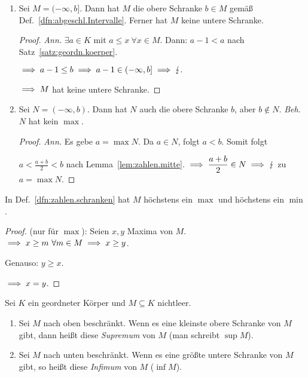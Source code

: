\documentclass[12pt]{scrreprt}
\begin{document}
\begin{bsp}
\begin{enumerate} %
\item Sei $M=(-\infty,b]$. Dann hat $M$ die obere Schranke $b\in M$ gemäß Def.~\ref{dfn:abgeschl.Intervalle}. Ferner hat $M$ keine untere Schranke.
\begin{proof}\emph{Ann.} $\exists a\in K$ mit $a \leq x\ \forall x\in M$. Dann: $a-1<a$ nach Satz~\ref{satz:geordn.koerper}.

$\implies a-1\leq b \implies a-1\in (-\infty,b] \implies \lightning.$

$\implies M$ hat keine untere Schranke.\end{proof}

\item Sei $N=(-\infty,b)$. Dann hat $N$ auch die obere Schranke $b$, aber $b\notin N$. \emph{Beh.} $N$ hat kein $\max$.
\begin{proof}\emph{Ann.} Es gebe $a=\max N$. Da $a\in N$, folgt $a<b$. Somit folgt

$\displaystyle a<\frac{a+b}{2}<b$ nach Lemma~\ref{lem:zahlen.mitte}. $\displaystyle\implies\frac{a+b}{2}\in N\implies\lightning$ zu $a = \max N$.\end{proof}
\end{enumerate}
\end{bsp}

\begin{bem}\label{bem:zahlen.einmax}
In Def.~\ref{dfn:zahlen.schranken} hat $M$ höchstens ein $\max$ und höchstens ein $\min$.
\end{bem}

\begin{proof}(nur für $\max$): Seien $x,y$ Maxima von $M$. $\implies x\geq m\ \forall m\in M\implies x\geq y$. 

Genauso: $y \geq x$.

$\implies x=y$.
\end{proof}

\begin{dfn}\label{dfn:zahlen.supinf}
Sei $K$ ein geordneter Körper und $M\subseteq K$ nichtleer.
\begin{enumerate}%
\item Sei $M$ nach oben beschränkt. Wenn es eine kleinste obere Schranke von $M$ gibt, dann heißt diese \emph{Supremum} von $M$ (man schreibt $\sup M$).

\item Sei $M$ nach unten beschränkt. Wenn es eine größte untere Schranke von $M$ gibt, so heißt diese \emph{Infimum} von $M$ ($\inf M$).
\end{enumerate}
\end{dfn}
\end{document}
